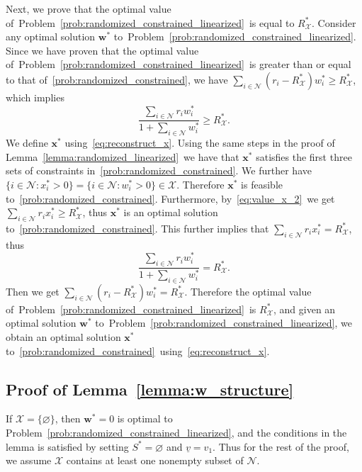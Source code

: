 \documentclass[mnsc,non-blindrev]{informs3}
\theoremstyle{definition}
\begin{document}
\begin{appendices}{\Large{}}
Next, we prove that the optimal value of~Problem~\eqref{prob:randomized_constrained_linearized}~is equal to $R^*_{\mathcal{X}}$. Consider any optimal solution $\bm{w}^*$ to~Problem~\eqref{prob:randomized_constrained_linearized}. Since we have proven that the optimal value of~Problem~\eqref{prob:randomized_constrained_linearized}~is greater than or equal to that of~\ref{prob:randomized_constrained}, we have
$\sum_{i\in\mathcal{N}}(r_i-R_{\mathcal{X}}^*)w_i^*\geq R_{\mathcal{X}}^*$, which implies
\begin{equation}
\dfrac{\sum_{i\in\mathcal{N}}r_iw_i^*}{1+\sum_{i\in\mathcal{N}}w_i^*}\geq R_{\mathcal{X}}^*.\label{eq:value_x_2}
\end{equation}
We define $\bm{x}^*$ using~\eqref{eq:reconstruct_x}. Using the same steps in the proof of Lemma~\ref{lemma:randomized_linearized}~we have that $\bm{x}^*$ satisfies the first three sets of constraints in~\ref{prob:randomized_constrained}. We further have $\{i\in\mathcal{N}:x_i^*>0\}=\{i\in\mathcal{N}:w_i^*>0\}\in\mathcal{X}$. Therefore $\bm{x}^*$ is feasible to~\ref{prob:randomized_constrained}. Furthermore, by~\eqref{eq:value_x_2}~we get $\sum_{i\in\mathcal{N}}r_ix_i^*\geq R_{\mathcal{X}}^*$, thus $\bm{x}^*$ is an optimal solution to~\ref{prob:randomized_constrained}. This further implies that $\sum_{i\in\mathcal{N}}r_ix_i^*=R^*_{\mathcal{X}}$, thus
\begin{equation*}
\dfrac{\sum_{i\in\mathcal{N}}r_iw_i^*}{1+\sum_{i\in\mathcal{N}}w_i^*}=R_{\mathcal{X}}^*.
\end{equation*}
Then we get $\sum_{i\in\mathcal{N}}(r_i-R_{\mathcal{X}}^*)w_i^*=R_{\mathcal{X}}^*$. Therefore the optimal value of~Problem~\eqref{prob:randomized_constrained_linearized}~is $R^*_{\mathcal{X}}$, and given an optimal solution $\bm{w}^*$ to~Problem~\eqref{prob:randomized_constrained_linearized}, we obtain an optimal solution $\bm{x}^*$ to~\ref{prob:randomized_constrained}~using~\eqref{eq:reconstruct_x}.

\subsection{Proof of Lemma~\ref{lemma:w_structure}}\label{sec:lemma:w_structure}

If $\mathcal{X}=\{\varnothing\}$, then $\bm{w}^*=0$ is optimal to Problem~\eqref{prob:randomized_constrained_linearized}, and the conditions in the lemma is satisfied by setting $S^*=\varnothing$ and $\underline{v}=v_1$. Thus for the rest of the proof, we assume $\mathcal{X}$ contains at least one nonempty subset of $\mathcal{N}$.


\end{appendices}
\end{document}
